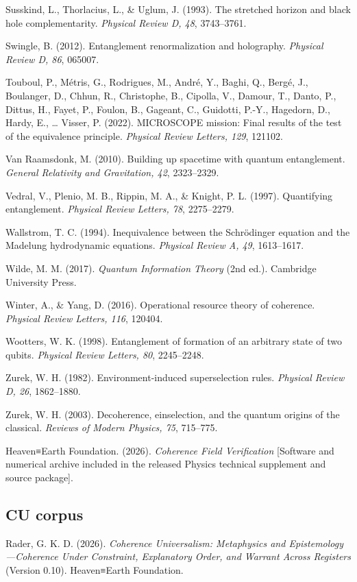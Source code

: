 \documentclass[
  11pt,
]{article}
\begin{document}
Susskind, L., Thorlacius, L., \& Uglum, J. (1993). The stretched horizon
and black hole complementarity. \emph{Physical Review D, 48},
3743--3761.

Swingle, B. (2012). Entanglement renormalization and holography.
\emph{Physical Review D, 86}, 065007.

Touboul, P., Métris, G., Rodrigues, M., André, Y., Baghi, Q., Bergé, J.,
Boulanger, D., Chhun, R., Christophe, B., Cipolla, V., Damour, T.,
Danto, P., Dittus, H., Fayet, P., Foulon, B., Gageant, C., Guidotti,
P.-Y., Hagedorn, D., Hardy, E., \ldots{} Visser, P. (2022). MICROSCOPE
mission: Final results of the test of the equivalence principle.
\emph{Physical Review Letters, 129}, 121102.

Van Raamsdonk, M. (2010). Building up spacetime with quantum
entanglement. \emph{General Relativity and Gravitation, 42}, 2323--2329.

Vedral, V., Plenio, M. B., Rippin, M. A., \& Knight, P. L. (1997).
Quantifying entanglement. \emph{Physical Review Letters, 78},
2275--2279.

Wallstrom, T. C. (1994). Inequivalence between the Schrödinger equation
and the Madelung hydrodynamic equations. \emph{Physical Review A, 49},
1613--1617.

Wilde, M. M. (2017). \emph{Quantum Information Theory} (2nd ed.).
Cambridge University Press.

Winter, A., \& Yang, D. (2016). Operational resource theory of
coherence. \emph{Physical Review Letters, 116}, 120404.

Wootters, W. K. (1998). Entanglement of formation of an arbitrary state
of two qubits. \emph{Physical Review Letters, 80}, 2245--2248.

Zurek, W. H. (1982). Environment-induced superselection rules.
\emph{Physical Review D, 26}, 1862--1880.

Zurek, W. H. (2003). Decoherence, einselection, and the quantum origins
of the classical. \emph{Reviews of Modern Physics, 75}, 715--775.

Heaven≡Earth Foundation. (2026). \emph{Coherence Field Verification}
{[}Software and numerical archive included in the released Physics
technical supplement and source package{]}.

\subsection{CU corpus}\label{cu-corpus}

Rader, G. K. D. (2026). \emph{Coherence Universalism: Metaphysics and
Epistemology---Coherence Under Constraint, Explanatory Order, and
Warrant Across Registers} (Version 0.10). Heaven≡Earth Foundation.
\end{document}
